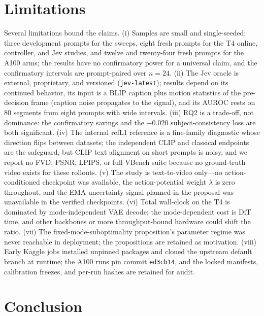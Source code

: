 \documentclass[journal]{IEEEtran}
\begin{document}
\section{Limitations}
\label{sec:limitations}

Several limitations bound the claims. (i) Samples are small and single-seeded: three development prompts for the sweeps, eight fresh prompts for the T4 online, controller, and Jev studies, and twelve and twenty-four fresh prompts for the A100 arms; the results have no confirmatory power for a universal claim, and the confirmatory intervals are prompt-paired over $n{=}24$. (ii) The Jev oracle is external, proprietary, and versioned (\texttt{jev-latest}); results depend on its continued behavior, its input is a BLIP caption plus motion statistics of the pre-decision frame (caption noise propagates to the signal), and its AUROC rests on 80 segments from eight prompts with wide intervals. (iii) RQ2 is a trade-off, not dominance: the confirmatory savings and the $-0.020$ subject-consistency loss are both significant. (iv) The internal refL1 reference is a fine-family diagnostic whose direction flips between datasets; the independent CLIP and classical endpoints are the safeguard, but CLIP text alignment on short prompts is noisy, and we report no FVD, PSNR, LPIPS, or full VBench suite because no ground-truth video exists for these rollouts. (v) The study is text-to-video only---no action-conditioned checkpoint was available, the action-potential weight $\lambda$ is zero throughout, and the EMA uncertainty signal planned in the proposal was unavailable in the verified checkpoints. (vi) Total wall-clock on the T4 is dominated by mode-independent VAE decode; the mode-dependent cost is DiT time, and other backbones or more throughput-bound hardware could shift the ratio. (vii) The fixed-mode-suboptimality proposition's parameter regime was never reachable in deployment; the propositions are retained as motivation. (viii) Early Kaggle jobs installed unpinned packages and cloned the upstream default branch at runtime; the A100 runs pin commit \texttt{ed3cb14}, and the locked manifests, calibration freezes, and per-run hashes are retained for audit.

\section{Conclusion}
\label{sec:conclusion}
\end{document}
